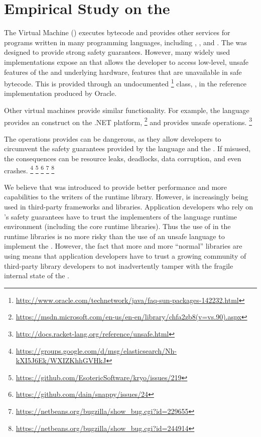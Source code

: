 \chapter{Empirical Study on the \unsafe{} \api{}}
\label{cha:unsafe}

The \java{} Virtual Machine (\jvm{}) executes \java{} bytecode and
provides other services for programs written in
many programming languages, including \java{}, \scala{}, and \clojure{}.
The \jvm{} was designed to provide strong safety guarantees.
However, many widely used \jvm{} implementations expose an \api{} that
allows the developer to access low-level,
unsafe features of the \jvm{} and underlying hardware,
features that are unavailable in safe \java{} bytecode.
This \api{} is provided through an undocumented%
\footnote{\url{http://www.oracle.com/technetwork/java/faq-sun-packages-142232.html}}
class, \smu{}, in the \java{} reference implementation produced by Oracle.

Other virtual machines provide similar functionality.
For example, the \csharp{} language provides an  construct
on the .NET platform,%
\footnote{\url{https://msdn.microsoft.com/en-us/en-en/library/chfa2zb8(v=vs.90).aspx}}
and \racket{} provides unsafe operations.%
\footnote{\url{http://docs.racket-lang.org/reference/unsafe.html}}

The operations \smu{} provides can be dangerous,
as they allow developers to circumvent the safety guarantees provided by
the \java{} language and the \jvm{}.
If misused, the consequences can be resource leaks, deadlocks,
data corruption, and even \jvm{} crashes.%
\footnote{\url{https://groups.google.com/d/msg/elasticsearch/Nh-kXI5J6Ek/WXIZKhhGVHkJ}}
\footnote{\url{https://github.com/EsotericSoftware/kryo/issues/219}}
\footnote{\url{https://github.com/dain/snappy/issues/24}}
\footnote{\url{https://netbeans.org/bugzilla/show_bug.cgi?id=229655}}
\footnote{\url{https://netbeans.org/bugzilla/show_bug.cgi?id=244914}}

We believe that \smu{} was introduced to provide better performance and
more capabilities to the writers of the \java{} runtime library.
However, \smu{} is increasingly being used in third-party
frameworks and libraries.
Application developers who rely on \java{}'s safety guarantees have to
trust the implementers of the language runtime environment
(including the core runtime libraries).
Thus the use of \smu{} in the runtime libraries is no more risky than
the use of an unsafe language to implement the \jvm{}.
However, the fact that more and more ``normal'' libraries are using
\smu{} means that application developers have to trust a growing
community of third-party \java{} library developers to not
inadvertently tamper with the fragile internal state of the \jvm{}.

